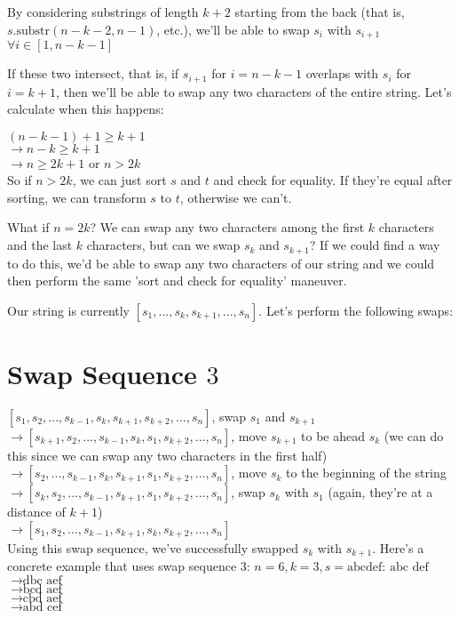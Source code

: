 \documentclass{article}
\begin{document}
By considering substrings of length $k+2$ starting from the back (that is, $s.\text{substr}(n-k-2, n-1)$, etc.), we'll be able to swap $s_i$ with $s_{i+1}$ $\forall i \in [1, n-k-1]$

If these two intersect, that is, if $s_{i+1}$ for $i=n-k-1$ overlaps with $s_i$ for $i = k+1$, then we'll be able to swap any two characters of the entire string. Let's calculate when this happens:

$(n-k-1)+1\ge k+1$\\
$\rightarrow n-k\ge k+1$\\
$\rightarrow n\ge 2k+1$ or $n > 2k$\\

So if $n>2k$, we can just sort $s$ and $t$ and check for equality. If they're equal after sorting, we can transform $s$ to $t$, otherwise we can't.

What if $n=2k$? We can swap any two characters among the first $k$ characters and the last $k$ characters, but can we swap $s_k$ and $s_{k+1}$? If we could find a way to do this, we'd be able to swap any two characters of our string and we could then perform the same 'sort and check for equality' maneuver.

Our string is currently $[s_1, ..., s_k, s_{k+1}, ..., s_n]$. Let's perform the following swaps:
\section{Swap Sequence $3$}
$[s_1, s_2, ..., s_{k-1}, s_k, s_{k+1}, s_{k+2}, ..., s_n]$, swap $s_1$ and $s_{k+1}$\\
$\rightarrow [s_{k+1}, s_2, ..., s_{k-1}, s_k, s_1, s_{k+2}, ..., s_n]$, move $s_{k+1}$ to be ahead $s_k$ (we can do this since we can swap any two characters in the first half)\\
$\rightarrow [s_2, ..., s_{k-1}, s_k, s_{k+1},s_1, s_{k+2}, ..., s_n]$, move $s_k$ to the beginning of the string\\
$\rightarrow [s_k, s_2, ..., s_{k-1}, s_{k+1},s_1, s_{k+2}, ..., s_n]$, swap $s_k$ with $s_1$ (again, they're at a distance of $k+1$)\\
$\rightarrow [s_1, s_2, ..., s_{k-1}, s_{k+1},s_k, s_{k+2}, ..., s_n]$\\

Using this swap sequence, we've successfully swapped $s_k$ with $s_{k+1}$. Here's a concrete example that uses swap sequence $3$: $n=6, k=3, s=\text{abcdef}$:
$\text{abc def}$\\
$\rightarrow\text{dbc aef}$\\
$\rightarrow\text{bcd aef}$\\
$\rightarrow\text{cbd aef}$\\
$\rightarrow\text{abd cef}$\\
\end{document}
